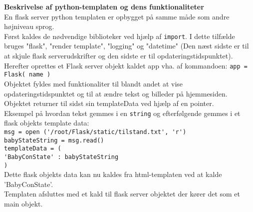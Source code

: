 \textbf{Beskrivelse af python-templaten og dens funktionaliteter}\\
En flask server python templaten er opbygget på samme måde som andre højniveau sprog. \\
Først kaldes de nødvendige biblioteker ved hjælp af \verb+import+. I dette tilfælde bruges "flask", "render template", "logging" og "datetime" (Den næst sidste er til at skjule flask serverudskrifter og den sidste er til opdateringstidspunktet). \\ 
Herefter oprettes et Flask server objekt kaldet app vha. af kommandoen: \verb+app = Flask( name )+ \\ 
Objektet fyldes med funktionaliter til blandt andet at vise opdateringstidspunktet og til at ændre tekst og billeder på hjemmesiden. Objektet returner til sidst sin templateData ved hjælp af en pointer. \\
Eksempel på hvordan tekst gemmes i en \verb+string+ og efterfølgende gemmes i et flask objekts template data: \\
 \verb+msg = open ('/root/Flask/static/tilstand.txt', 'r')+ \\
   \verb+babyStateString = msg.read()+ \\
   \verb+templateData = (+ \\
      \verb+'BabyConState' : babyStateString+\\
      \verb+)+ \\ Dette flask objekts data kan nu kaldes fra html-templaten ved at kalde 'BabyConState'. \\
Templaten afsluttes med et kald til flask server objektet der kører det som et main objekt. \\
\vspace{5mm}

